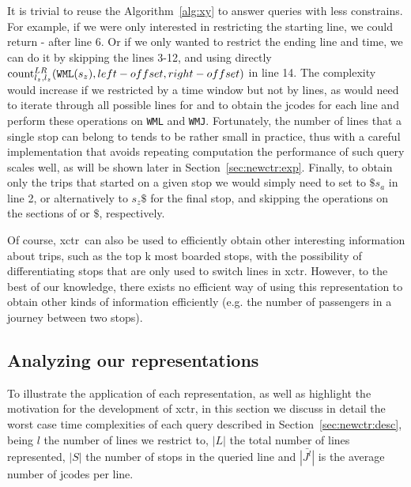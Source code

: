     It is trivial to reuse the Algorithm~\ref{alg:xy} to answer queries with less constrains. For example, if we were only interested in restricting the starting line, we could return - after line 6. Or if we only wanted to restrict the ending line and time, we can do it by skipping the lines 3-12, and using directly $\cnt^{LR}_{l_z,l_z}(\FuncSty{WML}(s_z),left-offset,right-offset)$ in line 14. The complexity would increase if we restricted by a time window but not by lines, as would need to iterate through all possible lines for  and  to obtain the jcodes for each line and perform these operations on \texttt{WML} and \texttt{WMJ}. Fortunately, the number of lines that a single stop can belong to tends to be rather small in practice, thus with a careful implementation that avoids repeating computation the performance of such query scales well, as will be shown later in Section~\ref{sec:newctr:exp}. Finally, to obtain only the trips that started on a given stop we would simply need to set  to $\$s_a$ in line 2, or alternatively to $s_z\$$ for the final stop, and skipping the operations on the sections of  or $\$$, respectively.
    
    Of course, \gls{xctr}~can also be used to efficiently obtain other interesting information about trips, such as the top k most boarded stops, 
    with the possibility of differentiating stops that are only used to switch lines in \gls{xctr}. However, to the best of our knowledge, there exists no efficient way of using this representation to obtain other kinds of information efficiently (e.g. the number of passengers in a journey between two stops).
	
	\subsection{Analyzing our representations}
	To illustrate the application of each representation, as well as highlight the motivation for the development of \gls{xctr}, in this section we discuss in detail the worst case time complexities of each query described in Section~\ref{sec:newctr:desc}, being $l$ the number of lines we restrict to, $|L|$ the total number of lines represented, $|S|$ the number of stops in the queried line and $\bar{|J^l|}$ is the average number of jcodes per line.
    
